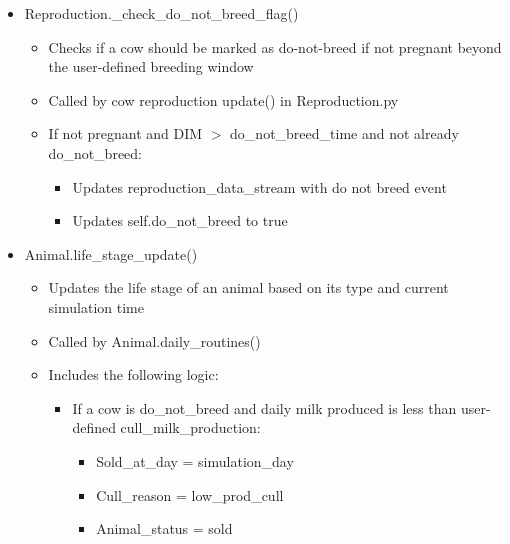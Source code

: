 \documentclass{article}
\begin{document}
\begin{refsection}
\begin{enumerate}
        \begin{itemize}
            \item Reproduction.\_check\_do\_not\_breed\_flag()
            \begin{itemize}
                \item Checks if a cow should be marked as do-not-breed if not pregnant beyond the user-defined breeding window 
                \item Called by cow reproduction update() in Reproduction.py 
                \item If not pregnant and DIM \(>\) do\_not\_breed\_time and not already do\_not\_breed:
                \begin{itemize}
                    \item Updates reproduction\_data\_stream with do not breed event
                    \item Updates self.do\_not\_breed to true
                \end{itemize}
            \end{itemize}
            \item Animal.life\_stage\_update()
            \begin{itemize}
                \item Updates the life stage of an animal based on its type and current simulation time
                \item Called by Animal.daily\_routines() 
                \item Includes the following logic: 
                \begin{itemize}
                    \item If a cow is do\_not\_breed and daily milk produced is less than user-defined cull\_milk\_production: 
                    \begin{itemize}
                        \item Sold\_at\_day = simulation\_day 
                        \item Cull\_reason = low\_prod\_cull
                        \item Animal\_status = sold 
                    \end{itemize}
                \end{itemize}
            \end{itemize}
        \end{itemize}
    
    \end{enumerate}


\end{refsection}
\end{document}

